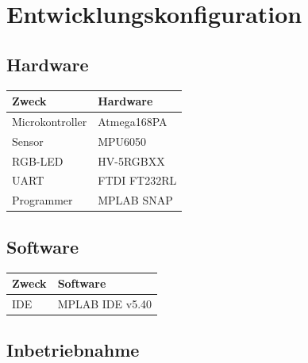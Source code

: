 \section{Entwicklungskonfiguration}
    \subsection{Hardware}

        \begin{center}
            \begin{tabular}{| l | l |}
                \hline
                Zweck & Hardware \\
                \hline
                Microkontroller & Atmega168PA \\
                \hline
                Sensor & MPU6050 \\
                \hline
                RGB-LED & HV-5RGBXX \\
                \hline
                UART & FTDI FT232RL\\
                \hline
                Programmer & MPLAB SNAP \\
                \hline
            \end{tabular}
        \end{center}

    \subsection{Software}

        \begin{center}
            \begin{tabular}{| l | l |}
                \hline
                Zweck & Software \\
                \hline
                IDE & MPLAB IDE v5.40 \\
                \hline
            \end{tabular}
        \end{center}


    \subsection{Inbetriebnahme}

